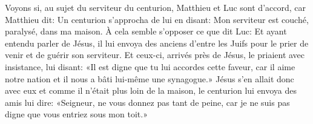 Voyons si, au sujet du serviteur du centurion, Matthieu et Luc sont d’accord,
	car Matthieu dit: Un centurion s’approcha de lui en disant:
	Mon serviteur est couché, paralysé, dans ma maison.
À cela semble s’opposer ce que dit Luc:
	Et ayant entendu parler de Jésus,
	il lui envoya des anciens d’entre les Juifs
	pour le prier de venir et de guérir son serviteur.
	Et ceux-ci, arrivés près de Jésus, le priaient avec insistance,
	lui disant: «Il est digne que tu lui accordes cette faveur,
	car il aime notre nation et il nous a bâti lui-même une synagogue.»
Jésus s’en allait donc avec eux et comme il n’était plus loin de la maison,
	le centurion lui envoya des amis lui dire:
	«Seigneur, ne vous donnez pas tant de peine,
	car je ne suis pas digne que vous entriez sous mon toit.»
